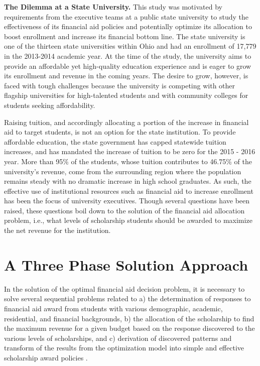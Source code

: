 \documentclass[12pt,english]{report}
\begin{document}
\vspace*{.15in} 
\noindent \textbf{The Dilemma at a State University.} This study was  motivated by requirements from the executive teams at a public state  university to study the effectiveness of its financial aid policies  and potentially optimize its allocation to boost enrollment and  increase its financial bottom line.   The state university is one of the thirteen state universities  within Ohio and had an enrollment of 17,779  in the 2013-2014 academic year. At the time of the study, the university aims to provide an affordable yet high-quality education experience and is eager to grow its enrollment and revenue in the  coming years.  The desire to grow, however, is faced with tough 
challenges because the university is competing with other flagship  universities for high-talented students and with community colleges  for students seeking affordability.

Raising tuition, and accordingly allocating a portion of the increase in financial aid to target students, is not an option for the state institution. To provide affordable education, the state government has capped statewide tuition increases, and has mandated the increase of tuition to be zero for the 2015 - 2016 year. More than 95\% of the students, whose tuition contributes to 46.75\% of the university's revenue, come from the surrounding region where the population remains steady with no dramatic increase in high school graduates. As such, the effective use of institutional resources such as financial aid to increase enrollment has been the focus of university executives. Though several questions have been raised, these questions boil down to the solution of the financial aid allocation problem, i.e., what levels of scholarship students should be awarded to maximize the net revenue for the institution.

\section{A Three Phase Solution Approach}
In the solution of the optimal financial aid decision problem,  it is necessary to solve several sequential problems related to a) the determination of responses to financial aid award from students with various demographic, academic, residential, and financial backgrounds, b) the allocation of the scholarship to find the maximum revenue for a given budget based on the response discovered to the various levels of scholarships, and c) derivation of discovered patterns and transform of the results from the optimization model into simple and effective scholarship award policies .
\end{document}
